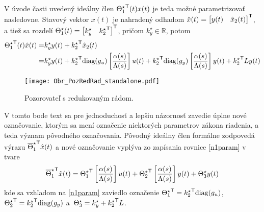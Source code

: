 \documentclass[a4paper, 10pt, ]{article}
\begin{document}
V úvode časti uvedený ideálny člen ${\Theta_1^\star}^{\mathsf{T}}(t) x(t)$ je teda možné parametrizovať nasledovne. Stavový vektor $x(t)$ je nahradený odhadom $\hat{x}(t) = \begin{bmatrix} y(t) & \hat{x}_2(t) \end{bmatrix}^{\mathsf{T}}$, a tiež sa rozdelí $\Theta_1^\star(t) = \begin{bmatrix} k_y^\star & {k_2^\star}^{\mathsf{T}} \end{bmatrix}^{\mathsf{T}}$, pričom $k_y^\star \in \mathbb{R}$, potom
\begin{equation} \label{n1param}
	\begin{split}
		{\Theta_1^\star}^{\mathsf{T}}(t) \hat{x}(t)
		= &
		k_y^\star y(t) + {k_2^\star}^{\mathsf{T}} \hat{x}_2(t)
		\\ = &
		k_y^\star y(t)
		+
		{k_2^\star}^{\mathsf{T}}
		\text{diag}(g_u) \left[ \frac{\alpha(s)}{\Lambda(s)} \right] u(t)
		+
		{k_2^\star}^{\mathsf{T}}
		\text{diag}(g_y) \left[ \frac{\alpha(s)}{\Lambda(s)} \right] y(t)
		+ {k_2^\star}^{\mathsf{T}} L y(t)
	\end{split}
\end{equation}






\begin{figure}[t]
    \centering
    \texttt{[image: Obr\_PozRedRad\_standalone.pdf]}
    \caption{Pozorovateľ s redukovaným rádom.}
    \label{Obr_PozRedRad}
\end{figure}








V tomto bode text sa pre jednoduchosť a lepšiu názornosť zavedie úplne nové označovanie, ktorým sa mení označenie niektorých parametrov zákona riadenia, a teda význam pôvodného označovania. Pôvodný ideálny člen formálne zodpovedá výrazu ${\overline{\Theta}_1^\star}^{\mathsf{T}} \hat{x}(t)$ a nové označovanie vyplýva zo zapísania rovnice \eqref{n1param} v tvare
\begin{equation} \label{n1param2}
	{\overline{\Theta}_1^\star}^{\mathsf{T}} \hat{x}(t)
	=
	{\Theta_1^\star}^{\mathsf{T}} \left[ \frac{\alpha(s)}{\Lambda(s)} \right] u(t)
	+
	{\Theta_2^\star}^{\mathsf{T}} \left[ \frac{\alpha(s)}{\Lambda(s)} \right] y(t)
	+
	\Theta_3^\star y(t)
\end{equation}
kde sa vzhľadom na \eqref{n1param} zaviedlo označenie ${\Theta_1^\star}^{\mathsf{T}} = {k_2^\star}^{\mathsf{T}} \text{diag}(g_u)$,   ${\Theta_2^\star}^{\mathsf{T}} = {k_2^\star}^{\mathsf{T}} \text{diag}(g_y)$ a~$\Theta_3^\star = k_y^\star + {k_2^\star}^{\mathsf{T}} L$.
\end{document}
